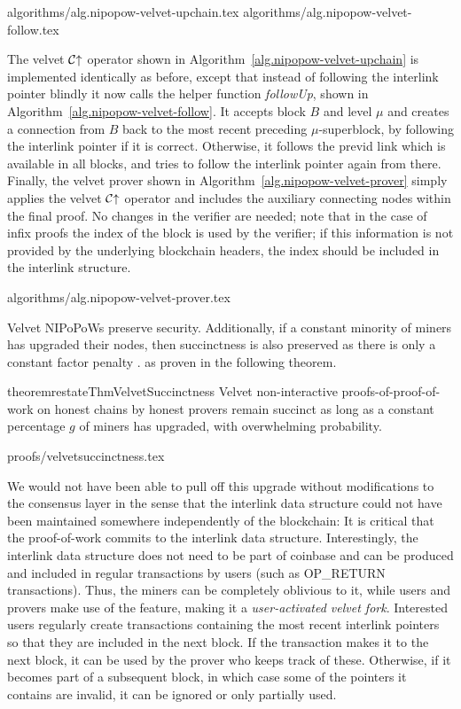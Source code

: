 {algorithms/alg.nipopow-velvet-upchain.tex}
{algorithms/alg.nipopow-velvet-follow.tex}

The velvet $\mathcal{C}\negthickspace\uparrow$ operator shown in
Algorithm~\ref{alg.nipopow-velvet-upchain} is implemented identically as
before, except that instead of following the interlink pointer blindly it now
calls the helper function \emph{followUp}, shown in
Algorithm~\ref{alg.nipopow-velvet-follow}. It accepts block $B$ and level $\mu$
and creates a connection from $B$ back to the most recent preceding
$\mu$-superblock, by following the interlink pointer if it is correct.
Otherwise, it follows the previd link which is available in all blocks, and
tries to follow the interlink pointer again from there. Finally, the velvet
prover shown in Algorithm~\ref{alg.nipopow-velvet-prover} simply applies the
velvet $\mathcal{C}\negthickspace\uparrow$ operator and includes the auxiliary connecting nodes
within the final proof. No changes in the verifier are needed; note that  in the
case of infix proofs the $\mathrm{index}$ of the block is used by the verifier;
if this information is not provided by the underlying blockchain headers, the
index should be included in the interlink structure.

{algorithms/alg.nipopow-velvet-prover.tex}

Velvet NIPoPoWs preserve security.
Additionally, if a constant minority of
miners has upgraded their nodes, then succinctness is also preserved
as there is only a constant factor penalty\ifndss
.
\else
 as proven in the following theorem.
\begin{restatable}{theorem}{restateThmVelvetSuccinctness}
    \label{thm.velvet-succinctness}
    Velvet non-interactive proofs-of-proof-of-work on honest chains by honest
    provers remain succinct as long as a constant percentage $g$ of miners has
    upgraded, with overwhelming probability.
\end{restatable}
{proofs/velvetsuccinctness.tex}
\fi

We would not have been able to pull off this upgrade without modifications to
the consensus layer in the sense that the interlink data structure could not
have been maintained somewhere independently of the blockchain: It is critical
that the proof-of-work commits to the interlink data structure. Interestingly,
the interlink data structure does not need to be part of coinbase and can be
produced and included in regular transactions by users (such as OP\_RETURN
transactions). Thus, the miners can be completely oblivious to it, while users
and provers make use of the feature, making it a \emph{user-activated velvet
fork}. Interested users regularly create transactions containing the most recent
interlink pointers so that they are included in the next block. If the
transaction makes it to the next block, it can be used by the prover who keeps
track of these. Otherwise, if it becomes part of a subsequent block, in which
case some of the pointers it contains are invalid, it can be ignored or only
partially used.

